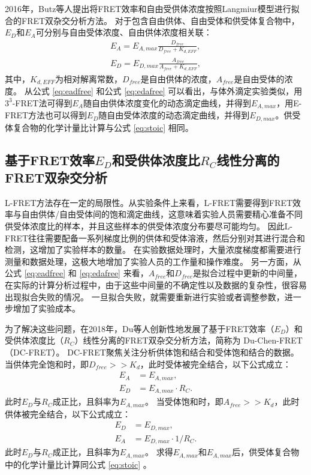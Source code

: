 2016年，Butz等人提出将FRET效率和自由受供体浓度按照Langmiur模型进行拟合的FRET双杂交分析方法。
对于包含自由供体、自由受体和供受体复合物中，$E_D$和$E_A$可分别与自由受体浓度、自由供体浓度相关联：
\begin{align}
    E_A = E_{A,max} \frac{D_{free}}{D_{free}+K_{d,EFF}}, \label{eq:eadfree} \\
    E_D = E_{D,max} \frac{A_{free}}{A_{free}+K_{d,EFF}}, \label{eq:edafree}
\end{align}
其中，$K_{d,EFF}$为相对解离常数，$D_{free}$是自由供体的浓度，$A_{free}$是自由受体的浓度。
从公式 \ref{eq:eadfree} 和公式 \ref{eq:edafree} 可以看出，与体外滴定实验类似，用$3^3$-FRET法可得到$E_A$随自由供体浓度变化的动态滴定曲线，并得到$E_{A,max}$，用E-FRET方法也可以得到$E_D$随自由受体浓度的动态滴定曲线，并得到$E_{D,max}$。供受体复合物的化学计量比计算与公式 \ref{eq:stoic} 相同。

\subsection{\texorpdfstring{基于FRET效率$E_D$和受供体浓度比$R_C$线性分离的FRET双杂交分析}{基于FRET效率Ed和受供体浓度比Rc线性分离的FRET双杂交分析（DC-FRET）}}

L-FRET方法存在一定的局限性。从实验条件上来看，L-FRET需要得到FRET效率与自由供体/自由受体间的饱和滴定曲线，这意味着实验人员需要精心准备不同供受体浓度比的样本，并且这些样本的供受体浓度分布要尽可能均匀。
因此L-FRET往往需要配备一系列梯度比例的供体和受体溶液，然后分别对其进行混合和检测，这增加了实验样本的数量。
在实验数据处理时，大量浓度梯度都需要进行测量和数据处理，这极大地增加了实验人员的工作量和操作难度。
另一方面，从公式 \ref{eq:eadfree} 和 \ref{eq:edafree} 来看，$A_{free}$和$D_{free}$是拟合过程中更新的中间量，在实际的计算分析过程中，由于这些中间量的不确定性以及数据的复杂性，很容易出现拟合失败的情况。
一旦拟合失败，就需要重新进行实验或者调整参数，进一步增加了实验成本。

为了解决这些问题，在2018年，Du等人创新性地发展了基于FRET效率（$E_D$）和受供体浓度比（$R_C$）线性分离的FRET双杂交分析方法，简称为 Du-Chen-FRET（DC-FRET）。
DC-FRET聚焦关注分析供体饱和结合和受体饱和结合的数据。
当供体完全饱和时，即$D_{free}>>K_d$，此时受体被完全结合，以下公式成立：
\begin{align} 
    E_A &= E_{A,max}, \label{eq:ea_appro} \\
    E_D &= {E_{A,max}}{\cdot}{R_C}. \label{eq:ea_slope}
\end{align}
此时$E_D$与$R_C$成正比，且斜率为$E_{A,max}$。
当受体饱和时，即$A_{free}>>K_d$，此时供体被完全结合，以下公式成立：
\begin{align}
    E_D &= E_{D,max}, \label{eq:ed_appro} \\
    E_A &= E_{D,max}{\cdot}{1/R_C}. \label{eq:ed_slope}
\end{align}
此时$E_D$与$R_C$成正比，且斜率为$E_{A,max}$。
求得$E_{A,max}$和$E_{A,max}$后，供受体复合物中的化学计量比计算同公式 \ref{eq:stoic} 。

